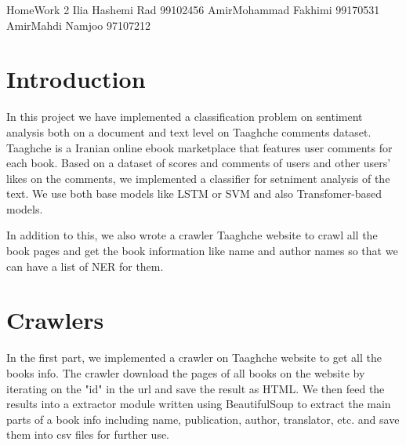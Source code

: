 \documentclass{solutionclass} %
\begin{document}
\pretitle
{HomeWork 2} %
{Ilia Hashemi Rad}
{99102456}
{AmirMohammad Fakhimi}
{99170531}
{AmirMahdi Namjoo}
{97107212}

\def\homeworkNumber{2}

\makeatletter
    \startcontents[sections]
\makeatother
    \def\Solu{Explanations}

\section{Introduction}

\begin{solution}
In this project we have implemented a classification problem on sentiment analysis both on a document and text level on Taaghche comments dataset. Taaghche is a Iranian online ebook marketplace that features user comments for each book. Based on a dataset of scores and comments of users and other users' likes on the comments, we implemented a classifier for setniment analysis of the text. We use both base models like LSTM or SVM and also Transfomer-based models.

In addition to this, we also wrote a crawler Taaghche website to crawl all the book pages and get the book information like name and author names so that we can have a list of NER for them.

\end{solution}


\section{Crawlers}

\begin{solution}
In the first part, we implemented a crawler on Taaghche website to get all the books info. The crawler download the pages of all books on the website by iterating on the "id" in the url and save the result as HTML. We then feed the results into a extractor module written using BeautifulSoup to extract the main parts of a book info including name, publication, author, translator, etc. and save them into csv files for further use.
\end{solution}
\end{document}
